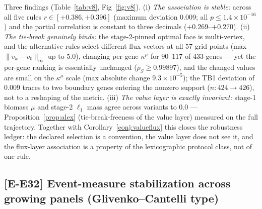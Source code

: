 \documentclass[11pt,a4paper]{article}
\theoremstyle{plain}
\theoremstyle{definition}
\theoremstyle{remark}
\newcommand{\kmu}{\kappa^{\mu}}
\begin{document}
Three findings (Table~\ref{tab:v8}, Fig~\ref{fig:v8}). (i) \emph{The association is
stable:} across all five rules $r \in [+0.386, +0.396]$ (maximum
deviation $0.009$; all $p \le 1.4 \times 10^{-16}$) and the partial
correlation is constant to three decimals ($+0.269$--$+0.270$). (ii)
\emph{The tie-break genuinely binds:} the stage-2-pinned optimal face
is multi-vertex, and the alternative rules select different flux
vectors at all $57$ grid points (max $\|v_k - v_0\|_\infty$ up to
$5.0$), changing per-gene $\kmu$ for $90$--$117$ of $433$ genes ---
yet the per-gene ranking is essentially unchanged
($\rho_S \ge 0.99897$), and the changed values are small on the
$\kmu$ scale (max absolute change $9.3 \times 10^{-5}$); the TB1
deviation of $0.009$ traces to two boundary genes entering the
nonzero support ($n: 424 \to 426$), not to a reshaping of the metric.
(iii) \emph{The value layer is exactly invariant:} stage-1 biomass
$\mu$ and stage-2 $\ell_1$ mass agree across variants to $0.0$ ---
Proposition~\ref{prop:alex} (tie-break-freeness of the value layer)
measured on the full trajectory. Together with
Corollary~\ref{conj:valueflux} this closes the robustness ledger: the
declared selection is a convention, the value layer does not see it,
and the flux-layer association is a property of the lexicographic
protocol class, not of one rule.

\subsection{[E-E32] Event-measure stabilization across growing
panels (Glivenko--Cantelli type)}\label{sec:e32}
\end{document}
